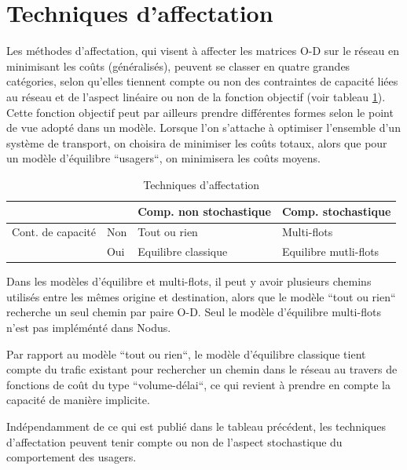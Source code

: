 \section{Techniques d'affectation}

Les méthodes d'affectation, qui visent à affecter les matrices O-D sur le réseau
en minimisant les coûts (généralisés), peuvent se classer en quatre grandes
catégories, selon qu'elles tiennent compte ou non des contraintes de capacité
liées au réseau et de l'aspect linéaire ou non de la fonction objectif (voir
tableau \ref{tab2_7}). Cette fonction objectif peut par ailleurs prendre
différentes formes selon le point de vue adopté dans un modèle. Lorsque l'on
s'attache à optimiser l'ensemble d'un système de transport, on choisira de
minimiser les coûts totaux, alors que pour un modèle d'équilibre ``usagers``, on
minimisera les coûts moyens.


\begin{table}[htbp]
\begin{center}
\begin{tabular}{llll}
\hline
& & Comp. non stochastique & Comp. stochastique \\
\hline
Cont. de capacité& Non & Tout ou rien & Multi-flots\\
& Oui & Equilibre classique & Equilibre mutli-flots\\
\hline
\end{tabular}
\caption{\label{tab2_7} Techniques d'affectation}
\end{center}
\end{table}


Dans les modèles d'équilibre et multi-flots, il peut y avoir plusieurs chemins utilisés entre
les mêmes origine et destination, alors que le modèle ``tout ou rien`` recherche un seul 
chemin par paire O-D. Seul le modèle d'équilibre multi-flots n'est pas impléménté dans Nodus.

Par rapport au modèle ``tout ou rien``, le modèle d'équilibre classique tient
compte du trafic existant pour rechercher un chemin dans le réseau au travers de
fonctions de coût du type ``volume-délai``, ce qui revient à prendre en compte
la capacité de manière implicite.

Indépendamment de ce qui est publié dans le tableau précédent, les techniques
d'affectation peuvent tenir compte ou non de l'aspect stochastique du
compor\-te\-ment des usagers.


